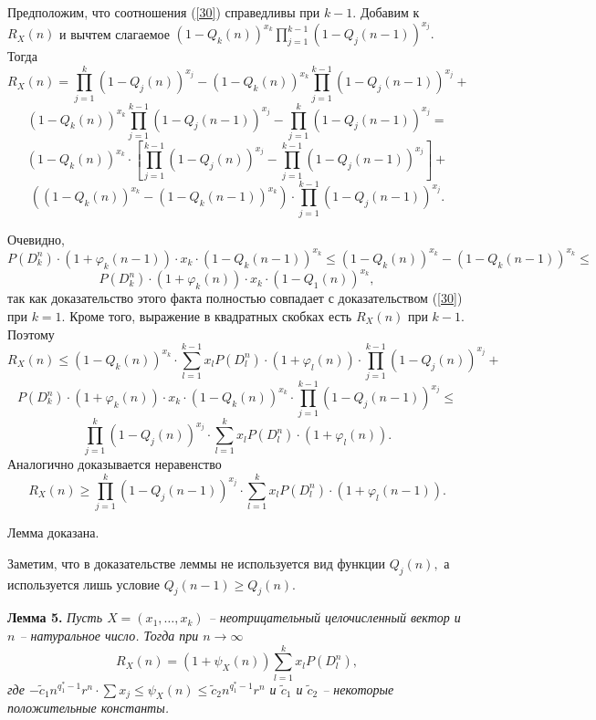 \documentclass[12pt,russian]{article}
\begin{document}
{Предположим, что соотношения (\ref{30}) справедливы при $k-1.$
Добавим к $R_X(n)$ и вычтем слагаемое
$\left(1-Q_k(n)\right)^{x_k}\prod_{j=1}^{k-1} \left(1-Q_j(n-1)\right)^{x_j}.$
Тогда
$$
R_X(n)=
\prod_{j=1}^k \left(1-Q_j(n)\right)^{x_j}-
\left(1-Q_k(n)\right)^{x_k}\prod_{j=1}^{k-1} \left(1-Q_j(n-1)\right)^{x_j}+
$$
$$
\left(1-Q_k(n)\right)^{x_k}\prod_{j=1}^{k-1}\left(1-Q_j(n-1)\right)^{x_j}-
\prod_{j=1}^{k} \left(1-Q_j(n-1)\right)^{x_j}=
$$
$$
\left(1-Q_k(n)\right)^{x_k} \cdot
\left[ \prod_{j=1}^{k-1}\left(1-Q_j(n)\right)^{x_j}
-\prod_{j=1}^{k-1} \left(1-Q_j(n-1)\right)^{x_j} \right]+
$$
$$
\left(\left(1-Q_k(n)\right)^{x_k} -\left(1-Q_k(n-1)\right)^{x_k} \right)
\cdot \prod_{j=1}^{k-1} \left(1-Q_j(n-1)\right)^{x_j} .
$$

Очевидно, 
$$
P(D_k^n)\cdot (1+\varphi_k(n-1))\cdot x_k \cdot (1-Q_k(n-1))^{x_k}
\le
\left(1-Q_k(n)\right)^{x_k} -\left(1-Q_k(n-1)\right)^{x_k} \le
$$
$$
P(D_k^n)\cdot (1+\varphi_k(n))\cdot x_k \cdot (1-Q_1(n))^{x_k} ,
$$
так как доказательство этого факта полностью совпадает с доказательством
(\ref{30}) при $k=1.$
Кроме того, выражение в квадратных скобках есть $R_X(n)$ при $k-1.$ Поэтому
$$
R_X(n) \le
\left(1-Q_k(n)\right)^{x_k} \cdot
\sum_{l=1}^{k-1} x_l P(D_l^{n})\cdot (1+\varphi_l(n)) \cdot
\prod_{j=1}^{k-1} \left(1-Q_j(n)\right)^{x_j}+
$$
$$
P(D_k^{n}) \cdot (1+\varphi_k(n)) \cdot x_k
\cdot \left(1-Q_k(n)\right)^{x_k}
\cdot \prod_{j=1}^{k-1} \left(1-Q_j(n-1)\right)^{x_j}\le
$$
$$
\prod_{j=1}^k \left(1-Q_j(n) \right)^{x_j} \cdot
\sum_{l=1}^k x_l P(D_l^{n})\cdot (1+\varphi_l(n)).
$$
Аналогично доказывается неравенство
$$
R_X(n) \ge
\prod_{j=1}^k \left(1-Q_j(n-1) \right)^{x_j} \cdot
\sum_{l=1}^k x_l P(D_l^{n})\cdot (1+\varphi_l(n-1)).
$$

Лемма доказана.

Заметим, что в доказательстве леммы 
не используется вид функции $Q_j(n),$ а используется лишь условие $Q_j(n-1) \ge Q_j(n).$
\medskip


\textbf {Лемма 5.}
{\em
Пусть $X=(x_1,\ldots,x_k)$ -- неотрицательный целочисленный вектор и $n$ --
натуральное число. Тогда при $n \rightarrow \infty$
$$
R_X(n)=
\left(1+\psi_X(n)\right)
\sum_{l=1}^k x_l P(D_l^{n}),
$$
где $-\tilde{c}_1 n^{q_1^{*}-1}r^n \cdot \sum x_j \le \psi_X(n)\le \tilde{c}_2n^{q_1^{*}-1 }r^n $ и
$\tilde{c}_1$ и $\tilde{c}_2$ -- некоторые положительные константы.%
\/}

\medskip

}
\end{document}
